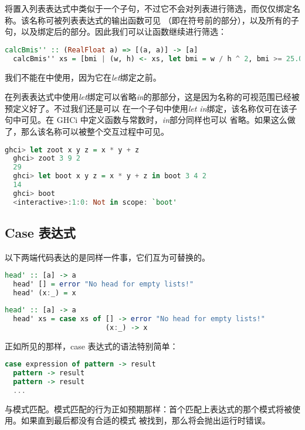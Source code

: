 \documentclass[./main.tex]{subfiles}
\begin{document}
将置入列表表达式中类似于一个子句，不过它不会对列表进行筛选，而仅仅绑定名称。该名称可被列表表达式的输出函数可见
（即在符号\acode{|}前的部分），以及所有的子句，以及绑定后的部分。因此我们可以让函数继续进行筛选：

\begin{lstlisting}[language=Haskell]
  calcBmis'' :: (RealFloat a) => [(a, a)] -> [a]
  calcBmis'' xs = [bmi | (w, h) <- xs, let bmi = w / h ^ 2, bmi >= 25.0]
\end{lstlisting}

我们不能在中使用，因为它在\textit{let}绑定之前。

在列表表达式中使用\textit{let}绑定可以省略\textit{in}的那部分，这是因为名称的可视范围已经被预定义好了。不过我们还是可以
在一个子句中使用\textit{let in}绑定，该名称仅可在该子句中可见。在 GHCi 中定义函数与常数时，\textit{in}部分同样也可以
省略。如果这么做了，那么该名称可以被整个交互过程中可见。

\begin{lstlisting}[language=Haskell]
  ghci> let zoot x y z = x * y + z
  ghci> zoot 3 9 2
  29
  ghci> let boot x y z = x * y + z in boot 3 4 2
  14
  ghci> boot
  <interactive>:1:0: Not in scope: `boot'
\end{lstlisting}

\subsection*{Case 表达式}

以下两端代码表达的是同样一件事，它们互为可替换的。

\begin{lstlisting}[language=Haskell]
  head' :: [a] -> a
  head' [] = error "No head for empty lists!"
  head' (x:_) = x
\end{lstlisting}

\begin{lstlisting}[language=Haskell]
  head' :: [a] -> a
  head' xs = case xs of [] -> error "No head for empty lists!"
                        (x:_) -> x
\end{lstlisting}

正如所见的那样，case 表达式的语法特别简单：

\begin{lstlisting}[language=Haskell]
  case expression of pattern -> result
  pattern -> result
  pattern -> result
  ...
\end{lstlisting}

与模式匹配。模式匹配的行为正如预期那样：首个匹配上表达式的那个模式将被使用。如果直到最后都没有合适的模式
被找到，那么将会抛出运行时错误。
\end{document}
